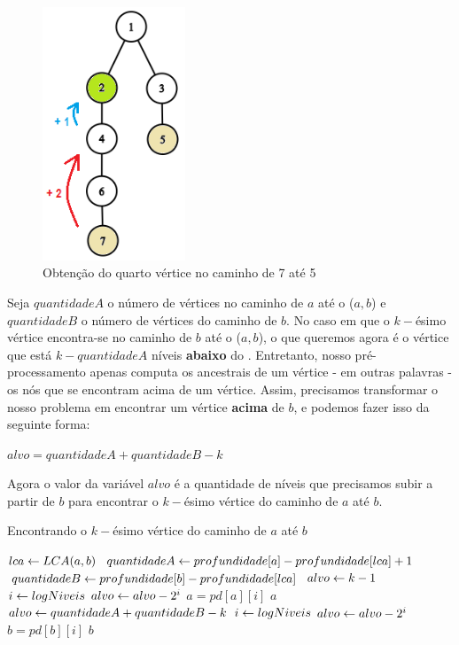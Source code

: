 \begin{figure}[htb]
\begin{center}
\includegraphics[width=4.25cm]{images/qtree2-graph.png}
\end{center}
\caption{\label{fig:arvore-euler2}Obtenção do quarto vértice no caminho de 7 até 5}
\end{figure}

Seja $quantidadeA$ o número de vértices no caminho de $a$ até o \LCA($a, b$) e $quantidadeB$ o número de vértices do caminho de $b$. No caso em que o $k-$ésimo vértice encontra-se no caminho de $b$ até o \LCA($a, b$), o que queremos agora é o vértice que está $k - quantidadeA$ níveis \textbf{abaixo} do \LCA. Entretanto, nosso pré-processamento apenas computa os ancestrais de um vértice - em outras palavras - os nós que se encontram acima de um vértice. Assim, precisamos transformar o nosso problema em encontrar um vértice \textbf{acima} de $b$, e podemos fazer isso da seguinte forma:

\begin{center}
$alvo = quantidadeA + quantidadeB - k$    
\end{center}

Agora o valor da variável $alvo$ é a quantidade de níveis que precisamos subir a partir de $b$ para encontrar o $k-$ésimo vértice do caminho de $a$ até $b$.

\begin{algorithm}[H]
\caption{Encontrando o $k-$ésimo vértice do caminho de $a$ até $b$}
\begin{algorithmic}[1]
    \State $lca \leftarrow LCA(a, b)$
    \State $quantidadeA \leftarrow profundidade[a] - profundidade[lca] + 1$
    \State $quantidadeB \leftarrow profundidade[b] - profundidade[lca]$
        \State $alvo \leftarrow k - 1$
        \State $i \leftarrow logNiveis$
                \State $alvo \leftarrow alvo - 2^i$
                \State $a = pd[a][i]$
            \EndIf
        \EndWhile
        \Return $a$
    \Else
        \State $alvo \leftarrow quantidadeA + quantidadeB - k$
        \State $i \leftarrow logNiveis$
                \State $alvo \leftarrow alvo - 2^i$
                \State $b = pd[b][i]$
            \EndIf
        \EndWhile
        \Return $b$
    \EndIf
\EndFunction
\end{algorithmic}
\end{algorithm}


